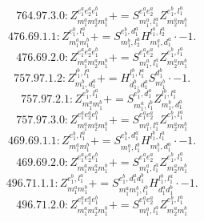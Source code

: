 \documentclass[letterpaper,10pt,fleqn,leqno,onecolumn]{article}
\begin{document}
\begin{equation} \;\;\;\;\;\;  764.97.3.0: Z^{e_{1}^{a}e_{2}^{a}e_{1}^{b}}_{m_{1}^{a}m_{2}^{a}m_{1}^{b}}+=S^{e_{1}^{a}e_{2}^{a}}_{m_{1}^{a},l_{1}^{a}}Z^{e_{1}^{b},l_{1}^{a}}_{m_{2}^{a}m_{1}^{b}} \end{equation}
\begin{equation} \;\;\;\;\;\;  476.69.1.1: Z^{e_{1}^{b},l_{1}^{a}}_{m_{1}^{a}m_{1}^{b}}+=S^{e_{1}^{b},d_{1}^{a}}_{m_{1}^{b},l_{2}^{a}}H^{l_{1}^{a},l_{2}^{a}}_{m_{1}^{a},d_{1}^{a}}\cdot -1. \end{equation}
\begin{equation} \;\;\;\;\;\;  476.69.2.0: Z^{e_{1}^{a}e_{2}^{a}e_{1}^{b}}_{m_{1}^{a}m_{2}^{a}m_{1}^{b}}+=S^{e_{1}^{a}e_{2}^{a}}_{m_{1}^{a},l_{1}^{a}}Z^{e_{1}^{b},l_{1}^{a}}_{m_{2}^{a}m_{1}^{b}} \end{equation}
\begin{equation} \;\;\;\;\;\;  757.97.1.2: Z^{l_{1}^{b},l_{1}^{a}}_{m_{1}^{b},d_{1}^{a}}+=H^{l_{1}^{b},l_{1}^{a}}_{d_{1}^{b},d_{1}^{a}}S^{d_{1}^{b}}_{m_{1}^{b}}\cdot -1. \end{equation}
\begin{equation} \;\;\;\;\;\;  757.97.2.1: Z^{e_{1}^{b},l_{1}^{a}}_{m_{1}^{a}m_{1}^{b}}+=S^{e_{1}^{b},d_{1}^{a}}_{m_{1}^{a},l_{1}^{b}}Z^{l_{1}^{b},l_{1}^{a}}_{m_{1}^{b},d_{1}^{a}} \end{equation}
\begin{equation} \;\;\;\;\;\;  757.97.3.0: Z^{e_{1}^{a}e_{2}^{a}e_{1}^{b}}_{m_{1}^{a}m_{2}^{a}m_{1}^{b}}+=S^{e_{1}^{a}e_{2}^{a}}_{m_{1}^{a},l_{1}^{a}}Z^{e_{1}^{b},l_{1}^{a}}_{m_{2}^{a}m_{1}^{b}} \end{equation}
\begin{equation} \;\;\;\;\;\;  469.69.1.1: Z^{e_{1}^{b},l_{1}^{a}}_{m_{1}^{a}m_{1}^{b}}+=S^{e_{1}^{b},d_{1}^{a}}_{m_{1}^{a},l_{1}^{b}}H^{l_{1}^{b},l_{1}^{a}}_{m_{1}^{b},d_{1}^{a}}\cdot -1. \end{equation}
\begin{equation} \;\;\;\;\;\;  469.69.2.0: Z^{e_{1}^{a}e_{2}^{a}e_{1}^{b}}_{m_{1}^{a}m_{2}^{a}m_{1}^{b}}+=S^{e_{1}^{a}e_{2}^{a}}_{m_{1}^{a},l_{1}^{a}}Z^{e_{1}^{b},l_{1}^{a}}_{m_{2}^{a}m_{1}^{b}} \end{equation}
\begin{equation} \;\;\;\;\;\;  496.71.1.1: Z^{e_{1}^{b},l_{1}^{a}}_{m_{1}^{a}m_{1}^{b}}+=S^{e_{1}^{b},d_{1}^{a}d_{1}^{b}}_{m_{1}^{a}m_{1}^{b},l_{1}^{b}}H^{l_{1}^{b},l_{1}^{a}}_{d_{1}^{a}d_{1}^{b}}\cdot -1. \end{equation}
\begin{equation} \;\;\;\;\;\;  496.71.2.0: Z^{e_{1}^{a}e_{2}^{a}e_{1}^{b}}_{m_{1}^{a}m_{2}^{a}m_{1}^{b}}+=S^{e_{1}^{a}e_{2}^{a}}_{m_{1}^{a},l_{1}^{a}}Z^{e_{1}^{b},l_{1}^{a}}_{m_{2}^{a}m_{1}^{b}} \end{equation}
\end{document}
